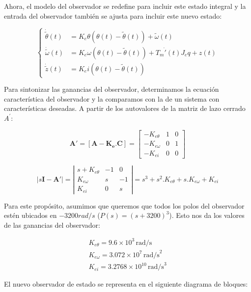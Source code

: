 \documentclass{article}
\begin{document}
Ahora, el modelo del observador se redefine para incluir este estado integral y la entrada del 
observador también se ajusta para incluir este nuevo estado:

\begin{equation}
    \begin{cases}
    \dot{\tilde{\theta}}(t) &= K_e \theta \left(\theta(t) - \tilde{\theta}(t)\right) + \tilde{\omega}(t) \\
    \dot{\tilde{\omega}}(t) &= K_e \omega \left(\theta(t) - \tilde{\theta}(t)\right) + T_m \dot{'}(t) J_eq + z(t) \\
    \dot{\tilde{z}}(t) &= K_e i \left(\theta(t) - \tilde{\theta}(t)\right)
    \end{cases}
\end{equation}

Para sintonizar las ganancias del observador, determinamos la ecuación característica del 
observador y la comparamos con la de un sistema con características deseadas. A partir de los autovalores 
de la matriz de lazo cerrado $A^\prime$:

\[
\mathbf{A}' = [\mathbf{A} - \mathbf{K_e}.\mathbf{C}] = \begin{bmatrix}
-K_{e\theta} & 1 & 0 \\
-K_{e \omega} & 0 & 1 \\
-K_{e i} & 0 & 0
\end{bmatrix}
\]

\[
\left| s\mathbf{I} - \mathbf{A}' \right| = \left| \begin{array}{ccc}
s + K_{e\theta} & -1 & 0 \\
K_{e \omega} & s & -1 \\
K_{e i} & 0 & s
\end{array} \right| = s^3 + s^2.K_{e \theta} + s.K_{e \omega} + K_{e i}
\]

Para este propósito, 
asumimos que queremos que todos los polos del observador estén ubicados en $-3200 rad/s$ ($ P(s) = (s + 3200)^3 $). Esto nos 
da los valores de las ganancias del observador:

\begin{align*}
    K_{e\theta} = 9.6 \times 10^3 \, \text{rad/s}\\
    K_{e\omega} = 3.072 \times 10^7 \, \text{rad/s}^2\\
    K_{ei} = 3.2768 \times 10^{10} \, \text{rad/s}^3
\end{align*}

El nuevo observador de estado se representa en el siguiente diagrama de bloques:
\end{document}
